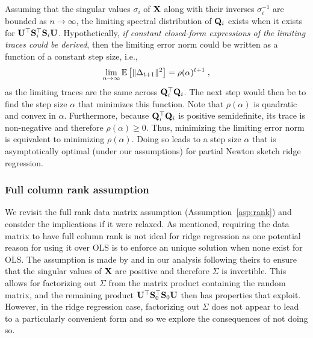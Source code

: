 Assuming that the singular values $\sigma_i$ of $\mathbf{X}$ along with their inverses $\sigma_i^{-1}$ are bounded as $n\rightarrow\infty$, the limiting spectral distribution of $\mathbf{Q}_i$ exists when it exists for $\mathbf{U}^\top\mathbf{S}_i^\top\mathbf{S}_i\mathbf{U}$. Hypothetically, \textit{if constant closed-form expressions of the limiting traces could be derived}, then the limiting error norm could be written as a function of a constant step size, i.e.,
\[
\lim_{n\rightarrow\infty}\mathbb{E}\left[\|\Delta_{t+1}\|^2\right] = \rho(\alpha)^{t+1} \;,
\]
as the limiting traces are the same across $\mathbf{Q}_i^\top\mathbf{Q}_i$. The next step would then be to find the step size $\alpha$ that minimizes this function. Note that $\rho(\alpha)$ is quadratic and convex in $\alpha$. Furthermore, because $\mathbf{Q}_i^\top\mathbf{Q}_i$ is positive semidefinite, its trace is non-negative and therefore $\rho(\alpha)\geq0$. Thus, minimizing the limiting error norm is equivalent to minimizing $\rho(\alpha)$. Doing so leads to a step size $\alpha$ that is asymptotically optimal (under our assumptions) for partial Newton sketch ridge regression.


\subsubsection{Full column rank assumption} \label{sec:fullrank}

We revisit the full rank data matrix assumption (Assumption~\ref{asp:rank}) and consider the implications if it were relaxed. As mentioned, requiring the data matrix to have full column rank is not ideal for ridge regression as one potential reason for using it over OLS is to enforce an unique solution when none exist for OLS. The assumption is made by \citet{Lacotte:2020} and in our analysis following theirs to ensure that the singular values of $\mathbf{X}$ are positive and therefore $\Sigma$ is invertible. This allows for factorizing out $\Sigma$ from the matrix product containing the random matrix, and the remaining product $\mathbf{U}^\top\mathbf{S}_0^\top\mathbf{S}_0\mathbf{U}$ then has properties that \citet{Lacotte:2020} exploit. However, in the ridge regression case, factorizing out $\Sigma$ does not appear to lead to a particularly convenient form and so we explore the consequences of not doing so.
\\

